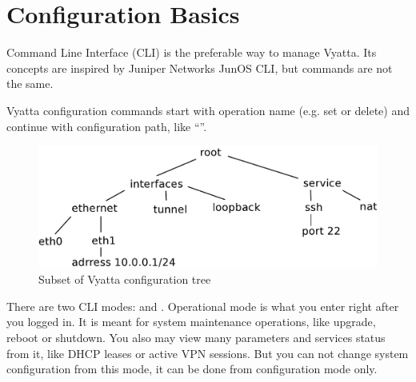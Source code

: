 \chapter{Configuration Basics}
Command Line Interface (CLI) is the preferable way to manage Vyatta. Its concepts are inspired by Juniper Networks
JunOS CLI, but commands are not the same.

Vyatta configuration commands start with operation name (e.g. set or delete) and continue with configuration path,
like ``''.

\begin{figure}[hc]
 \begin{center}
   \includegraphics[width=\textwidth]{images/config_tree}
   \caption{Subset of Vyatta configuration tree}
  \end{center}
\end{figure}


There are two CLI modes:  and . Operational mode is what you enter right after
you logged in. It is meant for system maintenance operations, like upgrade, reboot or shutdown. You also may view
many parameters and services status from it, like DHCP leases or active VPN sessions. But you can not change system
configuration from this mode, it can be done from configuration mode only.

